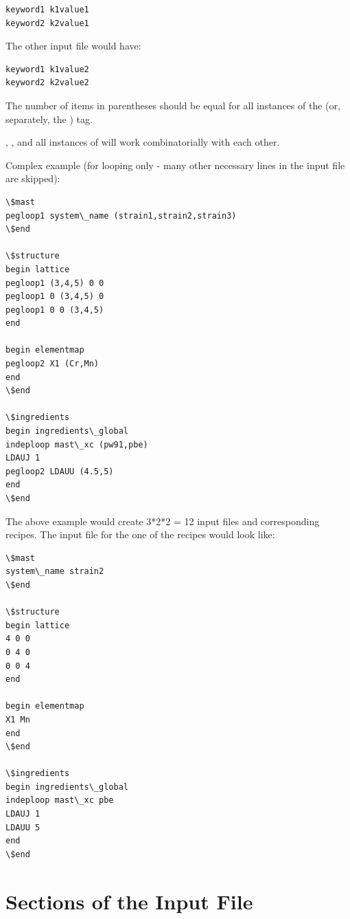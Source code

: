 \documentclass[letterpaper,10pt,english]{sphinxmanual}
\begin{document}
\begin{Verbatim}[commandchars=\\\{\}]
keyword1 k1value1
keyword2 k2value1
\end{Verbatim}

The other input file would have:

\begin{Verbatim}[commandchars=\\\{\}]
keyword1 k1value2
keyword2 k2value2
\end{Verbatim}

The number of items in parentheses should be equal for all instances of the  (or, separately, the ) tag.

, , and all instances of  will work combinatorially with each other.

Complex example (for looping only - many other necessary lines in the input file are skipped):

\begin{Verbatim}[commandchars=\\\{\}]
\$mast
pegloop1 system\_name (strain1,strain2,strain3)
\$end

\$structure
begin lattice
pegloop1 (3,4,5) 0 0
pegloop1 0 (3,4,5) 0
pegloop1 0 0 (3,4,5)
end

begin elementmap
pegloop2 X1 (Cr,Mn)
end
\$end

\$ingredients
begin ingredients\_global
indeploop mast\_xc (pw91,pbe)
LDAUJ 1
pegloop2 LDAUU (4.5,5)
end
\$end
\end{Verbatim}

The above example would create 3*2*2 = 12 input files and corresponding recipes. The input file for the one of the recipes would look like:

\begin{Verbatim}[commandchars=\\\{\}]
\$mast
system\_name strain2
\$end

\$structure
begin lattice
4 0 0
0 4 0
0 0 4
end

begin elementmap
X1 Mn
end
\$end

\$ingredients
begin ingredients\_global
indeploop mast\_xc pbe
LDAUJ 1
LDAUU 5
end
\$end
\end{Verbatim}


\chapter{Sections of the Input File}
\label{3_1_inputsections:sections-of-the-input-file}\label{3_1_inputsections::doc}
\end{document}
